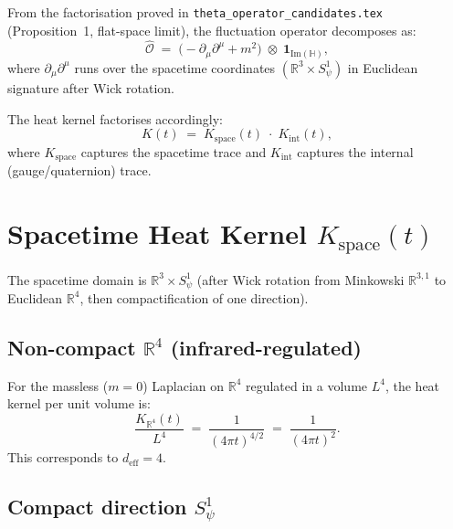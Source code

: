 \documentclass[11pt,a4paper]{article}
\theoremstyle{definition}
\theoremstyle{remark}
\begin{document}
From the factorisation proved in \texttt{theta\_operator\_candidates.tex}
(Proposition~1, flat-space limit), the fluctuation operator decomposes as:
\begin{equation}
  \hat{\mathcal{O}}
  \;=\; \bigl(-\partial_\mu\partial^\mu + m^2\bigr)
    \;\otimes\;
    \mathbf{1}_{\mathrm{Im}(\mathbb{H})},
  \label{eq:O_factored}
\end{equation}
where $\partial_\mu\partial^\mu$ runs over the spacetime coordinates
$(\mathbb{R}^3 \times S^1_\psi)$ in Euclidean signature after Wick rotation.

The heat kernel factorises accordingly:
\begin{equation}
  K(t) \;=\; K_{\mathrm{space}}(t) \;\cdot\; K_{\mathrm{int}}(t),
  \label{eq:K_factor}
\end{equation}
where $K_{\mathrm{space}}$ captures the spacetime trace and
$K_{\mathrm{int}}$ captures the internal (gauge/quaternion) trace.

\section{Spacetime Heat Kernel $K_{\mathrm{space}}(t)$}
\label{sec:K_space}

The spacetime domain is $\mathbb{R}^3 \times S^1_\psi$ (after Wick rotation
from Minkowski $\mathbb{R}^{3,1}$ to Euclidean $\mathbb{R}^4$, then
compactification of one direction). 

\subsection{Non-compact $\mathbb{R}^4$ (infrared-regulated)}
\label{sec:K_R4}

For the massless ($m=0$) Laplacian on $\mathbb{R}^4$ regulated in a volume
$L^4$, the heat kernel per unit volume is:
\begin{equation}
  \frac{K_{\mathbb{R}^4}(t)}{L^4}
  \;=\; \frac{1}{(4\pi t)^{4/2}}
  \;=\; \frac{1}{(4\pi t)^{2}}.
  \label{eq:K_R4}
\end{equation}
This corresponds to $d_{\mathrm{eff}} = 4$.

\subsection{Compact direction $S^1_\psi$}
\end{document}
